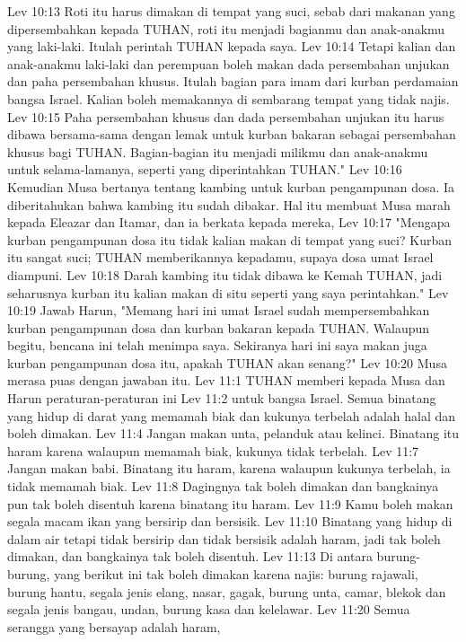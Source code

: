 Lev 10:13  Roti itu harus dimakan di tempat yang suci, sebab dari makanan yang dipersembahkan kepada TUHAN, roti itu menjadi bagianmu dan anak-anakmu yang laki-laki. Itulah perintah TUHAN kepada saya.
Lev 10:14  Tetapi kalian dan anak-anakmu laki-laki dan perempuan boleh makan dada persembahan unjukan dan paha persembahan khusus. Itulah bagian para imam dari kurban perdamaian bangsa Israel. Kalian boleh memakannya di sembarang tempat yang tidak najis.
Lev 10:15  Paha persembahan khusus dan dada persembahan unjukan itu harus dibawa bersama-sama dengan lemak untuk kurban bakaran sebagai persembahan khusus bagi TUHAN. Bagian-bagian itu menjadi milikmu dan anak-anakmu untuk selama-lamanya, seperti yang diperintahkan TUHAN."
Lev 10:16  Kemudian Musa bertanya tentang kambing untuk kurban pengampunan dosa. Ia diberitahukan bahwa kambing itu sudah dibakar. Hal itu membuat Musa marah kepada Eleazar dan Itamar, dan ia berkata kepada mereka,
Lev 10:17  "Mengapa kurban pengampunan dosa itu tidak kalian makan di tempat yang suci? Kurban itu sangat suci; TUHAN memberikannya kepadamu, supaya dosa umat Israel diampuni.
Lev 10:18  Darah kambing itu tidak dibawa ke Kemah TUHAN, jadi seharusnya kurban itu kalian makan di situ seperti yang saya perintahkan."
Lev 10:19  Jawab Harun, "Memang hari ini umat Israel sudah mempersembahkan kurban pengampunan dosa dan kurban bakaran kepada TUHAN. Walaupun begitu, bencana ini telah menimpa saya. Sekiranya hari ini saya makan juga kurban pengampunan dosa itu, apakah TUHAN akan senang?"
Lev 10:20  Musa merasa puas dengan jawaban itu.
Lev 11:1  TUHAN memberi kepada Musa dan Harun peraturan-peraturan ini
Lev 11:2  untuk bangsa Israel. Semua binatang yang hidup di darat yang memamah biak dan kukunya terbelah adalah halal dan boleh dimakan.
Lev 11:4  Jangan makan unta, pelanduk atau kelinci. Binatang itu haram karena walaupun memamah biak, kukunya tidak terbelah.
Lev 11:7  Jangan makan babi. Binatang itu haram, karena walaupun kukunya terbelah, ia tidak memamah biak.
Lev 11:8  Dagingnya tak boleh dimakan dan bangkainya pun tak boleh disentuh karena binatang itu haram.
Lev 11:9  Kamu boleh makan segala macam ikan yang bersirip dan bersisik.
Lev 11:10  Binatang yang hidup di dalam air tetapi tidak bersirip dan tidak bersisik adalah haram, jadi tak boleh dimakan, dan bangkainya tak boleh disentuh.
Lev 11:13  Di antara burung-burung, yang berikut ini tak boleh dimakan karena najis: burung rajawali, burung hantu, segala jenis elang, nasar, gagak, burung unta, camar, blekok dan segala jenis bangau, undan, burung kasa dan kelelawar.
Lev 11:20  Semua serangga yang bersayap adalah haram,
